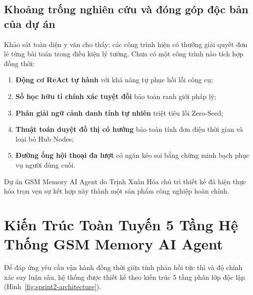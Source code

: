 \documentclass[a4paper,11pt]{article}
\begin{document}
\subsection{Khoảng trống nghiên cứu và đóng góp độc bản của dự án}
Khảo sát toàn diện y văn cho thấy: các công trình hiện có thường giải quyết đơn lẻ từng bài toán trong điều kiện lý tưởng. Chưa có một công trình nào tích hợp đồng thời:
\begin{enumerate}[noitemsep,topsep=2pt]
    \item \textbf{Động cơ ReAct tự hành} với khả năng tự phục hồi lỗi công cụ;
    \item \textbf{Số học hữu tỉ chính xác tuyệt đối} bảo toàn ranh giới pháp lý;
    \item \textbf{Phân giải ngữ cảnh danh tính tự nhiên} triệt tiêu lỗi Zero-Seed;
    \item \textbf{Thuật toán duyệt đồ thị có hướng} bảo toàn tính đơn điệu thời gian và loại bỏ Hub Nodes;
    \item \textbf{Đường ống hội thoại đa lượt} có ngăn kéo soi bằng chứng minh bạch phục vụ người dùng cuối.
\end{enumerate}
Dự án GSM Memory AI Agent do Trịnh Xuân Hóa chủ trì thiết kế đã hiện thực hóa trọn vẹn sự kết hợp này thành một sản phẩm công nghiệp hoàn chỉnh.

\clearpage
\section{Kiến Trúc Toàn Tuyến 5 Tầng Hệ Thống GSM Memory AI Agent}
\label{sec:architecture}

Để đáp ứng yêu cầu vận hành đồng thời giữa tính phản hồi tức thì và độ chính xác suy luận sâu, hệ thống được thiết kế theo kiến trúc 5 tầng phân lớp độc lập (Hình~\ref{fig:sprint2-architecture}).
\end{document}
